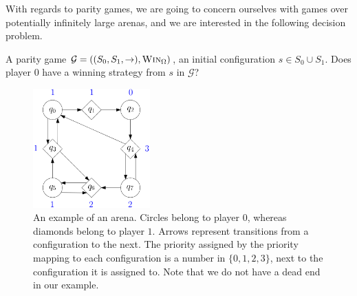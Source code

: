 With regards to parity games, we are going to concern ourselves with games over potentially infinitely large arenas, and we are interested in the following decision problem. \newline



\begin{samepage}
{A parity game $\mathcal{G}= ((S_0, S_1,{\rightarrow}),\textsc{Win}_\Omega)$, an initial configuration $s \in S_0 \cup S_1$.}
{Does player $0$ have a winning strategy from $s$ in $\mathcal{G}$?}
\end{samepage}


%

%












\begin{center}
	\begin{figure}
			\hspace{3.81cm}
\includegraphics[width=0.4\textwidth]{figures/parity_game}
	\caption{An example of an arena. Circles  belong to player $0$, whereas diamonds belong to player $1$. Arrows represent transitions from a configuration to the next. The priority assigned by the priority mapping to each configuration is a number in $\{0,1,2,3\}$, next to the configuration it is assigned to. Note that we do not have a dead end in our example.}
	\label{example_parity_game}
	\end{figure}
\end{center}

